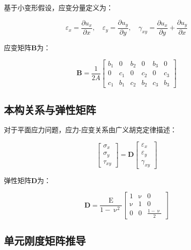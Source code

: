 \documentclass[12pt,a4paper]{article}
\newcommand{\E}{\mathrm{E}}           %
\newcommand{\pnu}{\upnu}             %
\begin{document}
基于小变形假设，应变分量定义为：

\begin{equation}
\varepsilon_x = \frac{\partial u_x}{\partial x}, \quad \varepsilon_y = \frac{\partial u_y}{\partial y}, \quad \gamma_{xy} = \frac{\partial u_x}{\partial y} + \frac{\partial u_y}{\partial x}
\end{equation}

应变矩阵$\boldsymbol{B}$为：

\begin{equation}
\boldsymbol{B} = \frac{1}{2A} \begin{bmatrix}
b_1 & 0 & b_2 & 0 & b_3 & 0 \\
0 & c_1 & 0 & c_2 & 0 & c_3 \\
c_1 & b_1 & c_2 & b_2 & c_3 & b_3
\end{bmatrix}
\end{equation}

\subsection{本构关系与弹性矩阵}

对于平面应力问题，应力-应变关系由广义胡克定律描述：

\begin{equation}
\begin{bmatrix} \sigma_x \\ \sigma_y \\ \tau_{xy} \end{bmatrix} = \boldsymbol{D} \begin{bmatrix} \varepsilon_x \\ \varepsilon_y \\ \gamma_{xy} \end{bmatrix}
\end{equation}

弹性矩阵$\boldsymbol{D}$为：

\begin{equation}
\boldsymbol{D} = \frac{\E}{1-\pnu^2} \begin{bmatrix}
1 & \pnu & 0 \\
\pnu & 1 & 0 \\
0 & 0 & \frac{1-\pnu}{2}
\end{bmatrix}
\end{equation}

\subsection{单元刚度矩阵推导}
\end{document}
